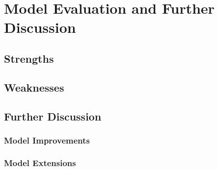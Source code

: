 \section{Model Evaluation and Further Discussion}

\subsection{Strengths}
\subsection{Weaknesses}

\subsection{Further Discussion}
\subsubsection{Model Improvements}
\subsubsection{Model Extensions}


